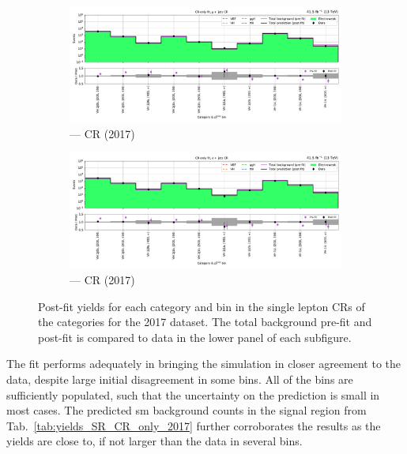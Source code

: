 \clearpage

\begin{figure}[htbp]
    \centering
    \begin{subfigure}[b]{\textwidth}
        \includegraphics[width=\textwidth]{chapters/higgstoinv/figures/mountain_ranges/2017/VH/Wmunu_tree_fit_b-abs_values_VH_cats.pdf}
        \caption{\VH --- \singleMuCr \gls{CR} (2017)}
    \end{subfigure}
    \hfill
    \begin{subfigure}[b]{\textwidth}
        \includegraphics[width=\textwidth]{chapters/higgstoinv/figures/mountain_ranges/2017/VH/Wenu_tree_fit_b-abs_values_VH_cats.pdf}
        \caption{\VH --- \singleEleCr \gls{CR} (2017)}
    \end{subfigure}
    \caption[Post-fit yields for each category and \ptmiss bin in the single lepton control regions of the \VH categories for the 2017 dataset]{Post-fit yields for each category and \ptmiss bin in the single lepton \glspl{CR} of the \VH categories for the 2017 dataset. The total background pre-fit and post-fit is compared to data in the lower panel of each subfigure.}
    \label{fig:htoinv_mountain_range_2017_single_lep_VH}
\end{figure}

The fit performs adequately in bringing the simulation in closer agreement to the data, despite large initial disagreement in some bins. All of the bins are sufficiently populated, such that the uncertainty on the prediction is small in most cases. The predicted \acrshort{sm} background counts in the signal region from Tab.~\ref{tab:yields_SR_CR_only_2017} further corroborates the results as the yields are close to, if not larger than the data in several bins.


